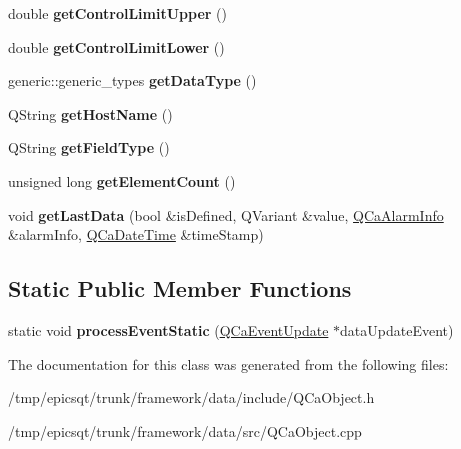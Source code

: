 \begin{DoxyCompactItemize}
\item 
\hypertarget{classqcaobject_1_1QCaObject_ae61c9c358be23786fca4457d95308693}{
double {\bfseries getControlLimitUpper} ()}
\label{classqcaobject_1_1QCaObject_ae61c9c358be23786fca4457d95308693}

\item 
\hypertarget{classqcaobject_1_1QCaObject_a71defa056a1259d822f23ca58d4b9707}{
double {\bfseries getControlLimitLower} ()}
\label{classqcaobject_1_1QCaObject_a71defa056a1259d822f23ca58d4b9707}

\item 
\hypertarget{classqcaobject_1_1QCaObject_a83e65a6279c75cbd8a60176585ab7d3c}{
generic::generic\_\-types {\bfseries getDataType} ()}
\label{classqcaobject_1_1QCaObject_a83e65a6279c75cbd8a60176585ab7d3c}

\item 
\hypertarget{classqcaobject_1_1QCaObject_a3f874cb4d25bd165ad4cb1b3ba8eb8e9}{
QString {\bfseries getHostName} ()}
\label{classqcaobject_1_1QCaObject_a3f874cb4d25bd165ad4cb1b3ba8eb8e9}

\item 
\hypertarget{classqcaobject_1_1QCaObject_a8f16073a1ea97bc9653c93e5f6ec34b3}{
QString {\bfseries getFieldType} ()}
\label{classqcaobject_1_1QCaObject_a8f16073a1ea97bc9653c93e5f6ec34b3}

\item 
\hypertarget{classqcaobject_1_1QCaObject_af52faf5d49f88d3de4aab0206ea14bab}{
unsigned long {\bfseries getElementCount} ()}
\label{classqcaobject_1_1QCaObject_af52faf5d49f88d3de4aab0206ea14bab}

\item 
\hypertarget{classqcaobject_1_1QCaObject_a99639501f1cb2e6173621bc953253273}{
void {\bfseries getLastData} (bool \&isDefined, QVariant \&value, \hyperlink{classQCaAlarmInfo}{QCaAlarmInfo} \&alarmInfo, \hyperlink{classQCaDateTime}{QCaDateTime} \&timeStamp)}
\label{classqcaobject_1_1QCaObject_a99639501f1cb2e6173621bc953253273}

\end{DoxyCompactItemize}
\subsection*{Static Public Member Functions}
\begin{DoxyCompactItemize}
\item 
\hypertarget{classqcaobject_1_1QCaObject_a6f6a66375836869a3bb3ca79987dc74e}{
static void {\bfseries processEventStatic} (\hyperlink{classQCaEventUpdate}{QCaEventUpdate} $\ast$dataUpdateEvent)}
\label{classqcaobject_1_1QCaObject_a6f6a66375836869a3bb3ca79987dc74e}

\end{DoxyCompactItemize}


The documentation for this class was generated from the following files:\begin{DoxyCompactItemize}
\item 
/tmp/epicsqt/trunk/framework/data/include/QCaObject.h\item 
/tmp/epicsqt/trunk/framework/data/src/QCaObject.cpp\end{DoxyCompactItemize}
